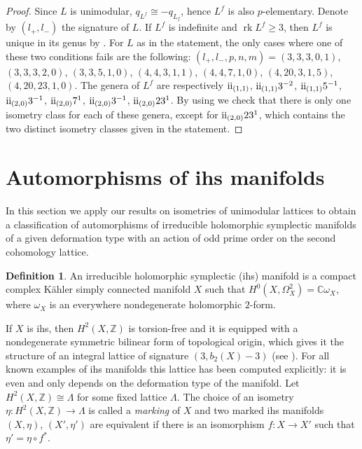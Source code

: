 \documentclass{amsart}
\theoremstyle{definition}
\newtheorem{definition}{Definition}[section]
\theoremstyle{plain}
\DeclareMathOperator{\rk}{rk}
\newcommand{\CC}{\mathbb{C}}
\newcommand{\IZ}{\mathbb{Z}}
\newcommand{\RN}[1]{\textup{\uppercase\expandafter{\romannumeral#1}}}
\newcommand{\even}{\RN{2}}
\begin{document}
\begin{proof}
Since $L$ is unimodular, $q_{L^f} \cong -q_{L_f}$,
hence $L^f$ is also $p$-elementary. Denote by $(l_+, l_-)$
the signature of $L$. If $L^f$ is indefinite and $\rk L^f \geq 3$,
then $L^f$ is unique in its genus by \cite[Ch.\ 15, Thm.\ 14]{conway_sloane}.
For $L$ as in the statement, the only cases where one of
these two conditions fails are the following:
$(l_+,l_-,p,n,m) = (3,3,3,0,1)$, $(3,3,3,2,0)$, $(3,3,5,1,0)$,
$(4,4,3,1,1)$, $(4,4,7,1,0)$, $(4,20,3,1,5)$, $(4,20,23,1,0)$.
The genera of $L^f$ are respectively $\even_{(1,1)}$,
$\even_{(1,1)}3^{-2}$, $\even_{(1,1)}5^{-1}$,
$\even_{(2,0)}3^{-1}$, $\even_{(2,0)}7^1$,
$\even_{(2,0)}3^{-1}$, $\even_{(2,0)}23^1$.
By using \cite[Ch.\ 15, Tables 15.1 and 15.2a]{conway_sloane}
we check that there is only one isometry class
for each of these genera, except for $\even_{(2,0)}23^1$,
which contains the two distinct isometry classes
given in the statement.
\end{proof}

\section{Automorphisms of ihs manifolds}\label{sec: autosihs}
In this section we apply our results on isometries of unimodular lattices to obtain a classification of automorphisms of irreducible holomorphic symplectic manifolds of a given deformation type with an action of odd prime order on the second cohomology lattice.

\begin{definition}
An irreducible holomorphic symplectic (ihs) manifold is a compact complex K\"ahler simply connected manifold $X$ such that $H^0(X, \Omega^2_X) = \CC \omega_X$, where $\omega_X$ is an everywhere nondegenerate holomorphic $2$-form.
\end{definition}
If $X$ is ihs, then $H^2(X,\IZ)$ is torsion-free and
it is equipped with a nondegenerate symmetric bilinear form
of topological origin, which gives it the structure of an integral lattice of signature $(3,b_2(X)-3)$ (see \cite[Thm.\ 4.7]{fujiki_relation}).
For all known examples of ihs manifolds this lattice has been
computed explicitly: it is even and only depends on the
deformation type of the manifold. Let $H^2(X,\IZ) \cong \Lambda$
for some fixed lattice $\Lambda$. The choice of an isometry
$\eta: H^2(X,\IZ) \rightarrow \Lambda$ is called a \emph{marking} of
$X$ and two marked ihs manifolds $(X, \eta)$, $(X', \eta')$
are equivalent if there is an isomorphism
$f: X \rightarrow X'$ such that $\eta' = \eta \circ f^*$.
\end{document}
